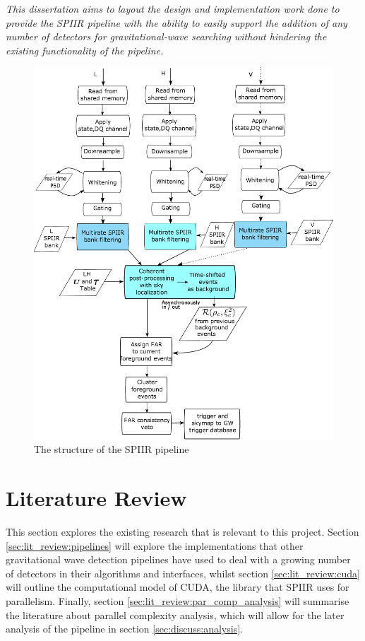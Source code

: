 \documentclass{article}
\begin{document}
\textit{This dissertation aims to layout the design and implementation work done to provide the SPIIR pipeline with the ability to easily support the addition of any number of detectors for gravitational-wave searching without hindering the existing functionality of the pipeline.}

\begin{figure}
    \centering
    \includegraphics[scale=0.18]{../seminar-presentation/online_xdet.jpg}
    \caption{The structure of the SPIIR pipeline}
    \label{fig:spiir_structure}
\end{figure}

\section{Literature Review} \label{sec:lit_review}

This section explores the existing research that is relevant to this project.
Section \ref{sec:lit_review:pipelines} will explore the implementations that other gravitational wave detection pipelines have used to deal with a growing number of detectors in their algorithms and interfaces, whilst section \ref{sec:lit_review:cuda} will outline the computational model of CUDA, the library that SPIIR uses for parallelism.
Finally, section \ref{sec:lit_review:par_comp_analysis} will summarise the literature about parallel complexity analysis, which will allow for the later analysis of the pipeline in section \ref{sec:discuss:analysis}.
\end{document}
